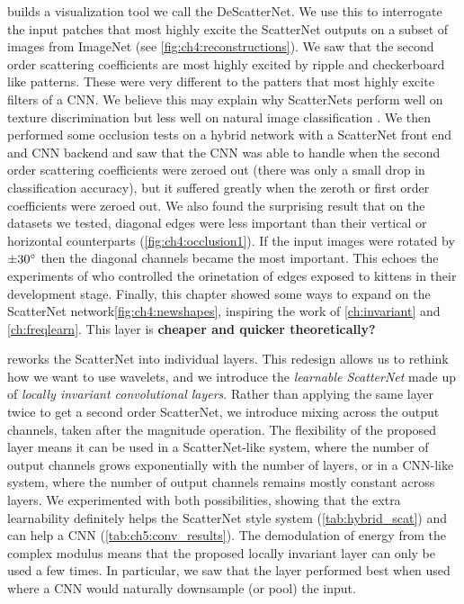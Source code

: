 \textbf{} builds a visualization tool we call the
DeScatterNet. We use this to interrogate the input patches that most highly
excite the ScatterNet outputs on a subset of images from ImageNet (see
\autoref{fig:ch4:reconstructions}). We saw that
the second order scattering coefficients are most highly excited by ripple and
checkerboard like patterns. These were very different to the patters
that most highly excite filters of a CNN. We believe this may explain why
ScatterNets perform well on texture discrimination \cite{bruna_invariant_2013}
but less well on natural image classification \cite{oyallon_deep_2015}. We then
performed some occlusion tests on a hybrid network with a ScatterNet front end
and CNN backend and saw that the CNN was able to handle when the second
order scattering coefficients were zeroed out (there was only a small drop in
classification accuracy), but it suffered greatly when the zeroth or first order
coefficients were zeroed out. We also found the surprising result that on the
datasets we tested, diagonal edges were less important than their vertical or 
horizontal counterparts (\autoref{fig:ch4:occlusion1}). If the input images were
rotated by $\pm 30^{\circ}$ then the diagonal channels became the most important.
This echoes the experiments of
\citeauthor{blakemore_development_1970}\cite{blakemore_development_1970} who
controlled the orinetation of edges exposed to kittens in their development
stage. Finally, this chapter showed some ways to expand on the ScatterNet
network\autoref{fig:ch4:newshapes}, inspiring the work of \autoref{ch:invariant}
and \autoref{ch:freqlearn}. This layer is \textbf{cheaper and quicker
theoretically?}

\textbf{} reworks the ScatterNet into individual layers.
This redesign allows us to rethink how we want to use wavelets, and we introduce
the \emph{learnable ScatterNet} made up of \emph{locally invariant convolutional
layers}. Rather than applying the same layer twice to get a second order
ScatterNet, we introduce mixing across the output channels, taken after the
magnitude operation. The flexibility of the proposed layer means it can be used
in a ScatterNet-like system, where the number of output channels grows
exponentially with the number of layers, or in a CNN-like system, where the
number of output channels remains mostly constant across layers. We experimented
with both possibilities, showing that the extra learnability definitely helps
the ScatterNet style system (\autoref{tab:hybrid_scat}) and can help a CNN
(\autoref{tab:ch5:conv_results}). The demodulation of energy from the complex
modulus means that the proposed locally invariant layer can only be used a few
times. In particular, we saw that the layer performed best when used where a CNN
would naturally downsample (or pool) the input.


